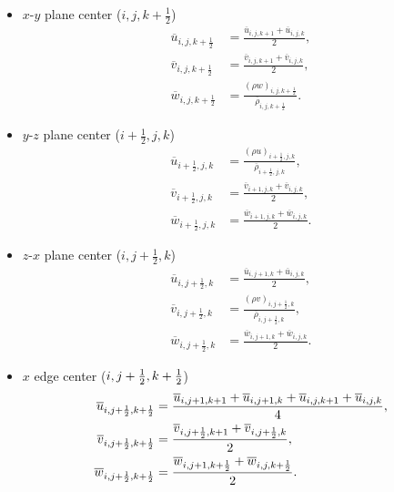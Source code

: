 \begin{itemize}
  \item $x$-$y$ plane center ($i,j,k+\frac{1}{2}$)
    \begin{align}
      \overline{u}_{i,j,k+\frac{1}{2}} &=
      \frac{\overline{u}_{i,j,k+1}+\overline{u}_{i,j,k}}{2}, \\
      \overline{v}_{i,j,k+\frac{1}{2}} &=
      \frac{\overline{v}_{i,j,k+1}+\overline{v}_{i,j,k}}{2}, \\
      \overline{w}_{i,j,k+\frac{1}{2}} &=
      \frac{(\rho w)_{i,j,k+\frac{1}{2}}}{\overline{\rho}_{i,j,k+\frac{1}{2}}}.
    \end{align}

  \item $y$-$z$ plane center ($i+\frac{1}{2},j,k$)
    \begin{align}
      \overline{u}_{i+\frac{1}{2},j,k} &=
      \frac{(\rho u)_{i+\frac{1}{2},j,k}}{\overline{\rho}_{i+\frac{1}{2},j,k}}, \\
      \overline{v}_{i+\frac{1}{2},j,k} &=
      \frac{\overline{v}_{i+1,j,k}+\overline{v}_{i,j,k}}{2}, \\
      \overline{w}_{i+\frac{1}{2},j,k} &=
      \frac{\overline{w}_{i+1,j,k}+\overline{w}_{i,j,k}}{2}.
    \end{align}

  \item $z$-$x$ plane center ($i,j+\frac{1}{2},k$)
    \begin{align}
      \overline{u}_{i,j+\frac{1}{2},k} &=
      \frac{\overline{u}_{i,j+1,k}+\overline{u}_{i,j,k}}{2}, \\
      \overline{v}_{i,j+\frac{1}{2},k} &=
      \frac{(\rho v)_{i,j+\frac{1}{2},k}}{\overline{\rho}_{i,j+\frac{1}{2},k}}, \\
      \overline{w}_{i,j+\frac{1}{2},k} &=
      \frac{\overline{w}_{i,j+1,k}+\overline{w}_{i,j,k}}{2}.
    \end{align}

  \item $x$ edge center ($i,j+\frac{1}{2},k+\frac{1}{2}$)
    \begin{align}
      \overline{u}_{i,j+\frac{1}{2},k+\frac{1}{2}} &=
      \frac{\overline{u}_{i,j+1,k+1}+\overline{u}_{i,j+1,k}+\overline{u}_{i,j,k+1}+\overline{u}_{i,j,k}}{4}, \\
      \overline{v}_{i,j+\frac{1}{2},k+\frac{1}{2}} &=
      \frac{\overline{v}_{i,j+\frac{1}{2},k+1}+\overline{v}_{i,j+\frac{1}{2},k}}{2}, \\
      \overline{w}_{i,j+\frac{1}{2},k+\frac{1}{2}} &=
      \frac{\overline{w}_{i,j+1,k+\frac{1}{2}}+\overline{w}_{i,j,k+\frac{1}{2}}}{2}.
    \end{align}


\end{itemize}
